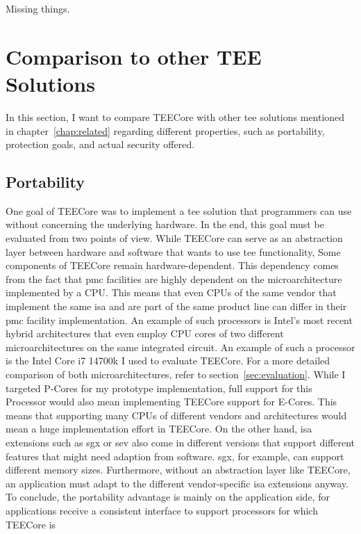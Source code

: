 Missing things. 

\section{Comparison to other TEE Solutions}
\label{eval:compare}
In this section, I want to compare TEECore with other \gls{tee} solutions
mentioned in chapter~\ref{chap:related} regarding different properties, such as
portability, protection goals, and actual security offered.

\subsection{Portability}
\label{eval:compare:portability}
One goal of TEECore was to implement a \gls{tee} solution that programmers can
use without concerning the underlying hardware. In the end, this goal must be
evaluated from two points of view. While TEECore can serve as an abstraction
layer between hardware and software that wants to use \gls{tee} functionality,
Some components of TEECore remain hardware-dependent. This dependency comes from
the fact that \gls{pmc} facilities are highly dependent on the microarchitecture
implemented by a CPU. This means that even CPUs of the same vendor that
implement the same \gls{isa} and are part of the same product line can differ in
their \gls{pmc} facility implementation. An example of such processors is
Intel's most recent hybrid architectures that even employ CPU cores of two
different microarchitectures on the same integrated circuit. An example of such
a processor is the Intel Core i7 14700k I used to evaluate TEECore. For a more
detailed comparison of both microarchitectures, refer to
section~\ref{sec:evaluation}. While I targeted P-Cores for my prototype
implementation, full support for this Processor would also mean implementing
TEECore support for E-Cores. This means that supporting many CPUs of different
vendors and architectures would mean a huge implementation effort in TEECore. On
the other hand, \gls{isa} extensions such as \gls{sgx} or \gls{sev} also come in
different versions that support different features that might need adaption from
software. \gls{sgx}, for example, can support different memory sizes.
Furthermore, without an abstraction layer like TEECore, an application must
adapt to the different vendor-specific \gls{isa} extensions anyway. To conclude,
the portability advantage is mainly on the application side, for applications
receive a consistent interface to support processors for which TEECore is
